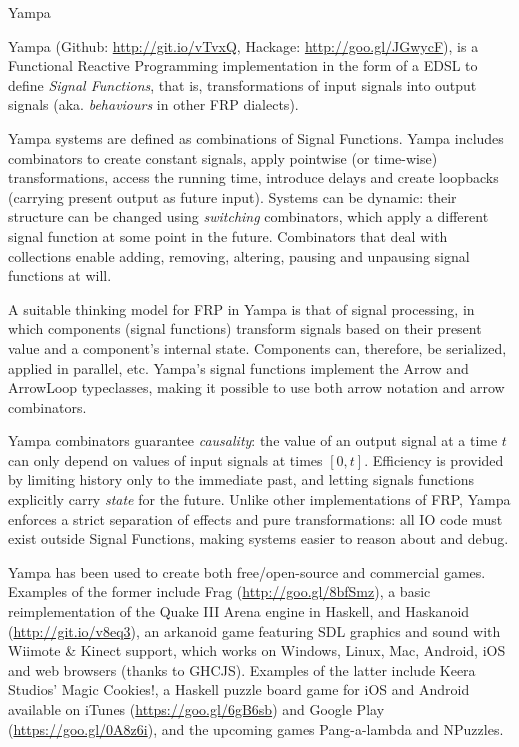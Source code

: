 \begin{hcarentry}[updated]{Yampa}
\label{yampa}
\makeheader

Yampa (Github: \href{http://git.io/vTvxQ}{http://git.io/vTvxQ}, Hackage:
\href{http://goo.gl/JGwycF}{http://goo.gl/JGwycF}), is a Functional Reactive
Programming implementation in the form of a EDSL to define \emph{Signal
Functions}, that is, transformations of input signals into output signals
(aka. \emph{behaviours} in other FRP dialects).

Yampa systems are defined as combinations of Signal Functions. Yampa includes
combinators to create constant signals, apply pointwise (or time-wise)
transformations, access the running time, introduce delays and create
loopbacks (carrying present output as future input). Systems can be
dynamic: their structure can be changed using \emph{switching}
combinators, which apply a different signal function at some point in
the future. Combinators that deal with collections enable adding,
removing, altering, pausing and unpausing signal functions at will.

A suitable thinking model for FRP in Yampa is that of signal
processing, in which components (signal functions) transform signals
based on their present value and a component's internal state.
Components can, therefore, be serialized, applied in parallel, etc.
Yampa's signal functions implement the Arrow and ArrowLoop
typeclasses, making it possible to use both arrow notation and arrow
combinators.

Yampa combinators guarantee \emph{causality}: the value of an output
signal at a time $t$ can only depend on values of input signals at
times $[0,t]$. Efficiency is provided by limiting history only to the
immediate past, and letting signals functions explicitly carry
\emph{state} for the future.  Unlike other implementations of FRP,
Yampa enforces a strict separation of effects and pure
transformations: all IO code must exist outside Signal Functions,
making systems easier to reason about and debug.

Yampa has been used to create both free/open-source and commercial games.
Examples of the former include Frag
(\href{http://goo.gl/8bfSmz}{http://goo.gl/8bfSmz}), a basic reimplementation
of the Quake III Arena engine in Haskell, and Haskanoid
(\href{http://git.io/v8eq3}{http://git.io/v8eq3}), an arkanoid game featuring
SDL graphics and sound with Wiimote \& Kinect support, which works on Windows,
Linux, Mac, Android, iOS and web browsers (thanks to GHCJS). Examples of the
latter include Keera Studios' Magic Cookies!, a Haskell puzzle board game for
iOS and Android available on iTunes
(\href{https://goo.gl/6gB6sb}{https://goo.gl/6gB6sb})
and Google Play
(\href{https://goo.gl/0A8z6i}{https://goo.gl/0A8z6i}), and the upcoming
games Pang-a-lambda and NPuzzles.


\end{hcarentry}
